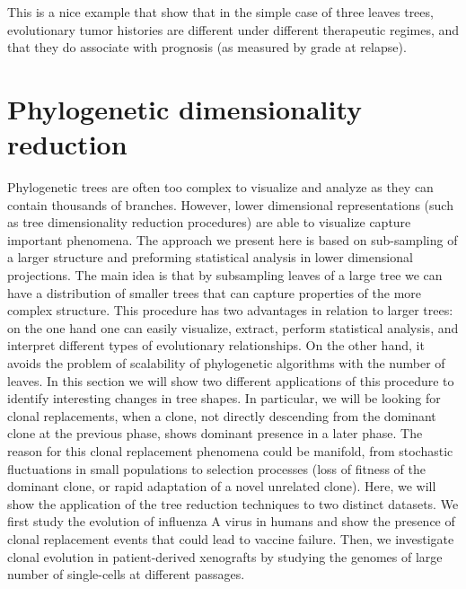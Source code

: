 \documentclass[a4paper,11pt]{article}
\begin{document}
This is a nice example that show that in the simple case of three leaves trees, evolutionary tumor histories are different under different therapeutic regimes, and that they do associate with prognosis (as measured by grade at relapse).


\section{Phylogenetic dimensionality reduction}\label{sec:xeno_flu}

Phylogenetic trees are often too complex to visualize and analyze as they can contain thousands of branches.
However, lower dimensional representations (such as tree dimensionality reduction procedures) are able to visualize capture important phenomena.
The approach we present here is based on sub-sampling of a larger structure and preforming statistical analysis in lower dimensional projections.
The main idea is that by subsampling leaves of a large tree we can have a distribution of smaller trees that can capture properties of the more complex structure.
This procedure has two advantages in relation to larger trees: on the one hand one can easily visualize, extract, perform statistical analysis, and interpret different types of evolutionary relationships.
On the other hand, it avoids the problem of scalability of phylogenetic algorithms with the number of leaves.
In this section we will show two different applications of this procedure to identify interesting changes in tree shapes.
In particular, we will be looking for clonal replacements, when a clone, not directly descending from the dominant clone at the previous phase, shows dominant presence in a later phase.
The reason for this clonal replacement phenomena could be manifold, from stochastic fluctuations in small populations to selection processes (loss of fitness of the dominant clone, or rapid adaptation of a novel unrelated clone).
Here, we will show the application of the tree reduction techniques to two distinct datasets.
We first study the evolution of influenza A virus in humans and show the presence of clonal replacement events that could lead to vaccine failure.
Then, we investigate clonal evolution in patient-derived xenografts by studying the genomes of large number of single-cells at different passages.
\end{document}
